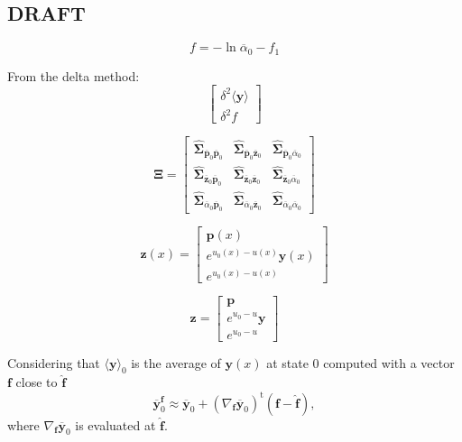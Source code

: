 \documentclass[aip,jcp,reprint,amsmath,amssymb]{revtex4-1}
\newcommand{\mt}[1]{\boldsymbol{\mathbf{#1}}}           %
\newcommand{\vt}[1]{\boldsymbol{\mathbf{#1}}}           %
\newcommand{\tr}[1]{#1^\text{t}}                        %
\begin{document}
\subsection{DRAFT}


\begin{equation*}
f = -\ln \overline{\alpha}_0 - f_1
\end{equation*}

From the delta method:
\begin{equation*}
\left[\begin{array}{c} \delta^2 \langle \vt y \rangle \\ \delta^2 f \end{array}\right]
\end{equation*}

\begin{equation*}
\mt \Xi = \left[\begin{array}{ccc} \hat{\mt \Sigma}_{\overline{\vt p}_0 \overline{\vt p}_0} & \hat{\mt \Sigma}_{\overline{\vt p}_0 \overline{\vt z}_0} & \hat{\mt \Sigma}_{\overline{\vt p}_0 \overline{\alpha}_0} \\ \hat{\mt \Sigma}_{\overline{\vt z}_0 \overline{\vt p}_0} & \hat{\mt \Sigma}_{\overline{\vt z}_0 \overline{\vt z}_0} & \hat{\mt \Sigma}_{\overline{\vt z}_0 \overline{\alpha}_0} \\ \hat{\mt \Sigma}_{\overline{\alpha}_0 \overline{\vt p}_0} & \hat{\mt \Sigma}_{\overline{\alpha}_0 \overline{\vt z}_0} & \hat{\mt \Sigma}_{\overline{\alpha}_0 \overline{\alpha}_0} \end{array}\right]
\end{equation*}

\begin{equation*}
\vt z(x) = \left[\begin{array}{c}
{\vt p}(x) \\
e^{u_0(x) - u(x)}{\vt y}(x) \\
e^{u_0(x) - u(x)}
\end{array}\right]
\end{equation*}

\begin{equation*}
\vt z = \left[\begin{array}{c}
{\vt p} \\
e^{u_0 - u}{\vt y} \\
e^{u_0 - u}
\end{array}\right]
\end{equation*}




Considering that $\langle{\vt y}\rangle_0$ is the average of $\vt y(x)$ at state $0$ computed with a vector $\vt f$ close to $\hat{\vt f}$
\begin{equation*}
\overline{\vt y}^{\vt f}_0 \approx \overline{\vt y}_0 + \tr{(\nabla_{\vt f}\overline{\vt y}_0)}({\vt f} - \hat{\vt f}),
\end{equation*}
where $\nabla_{\vt f}\overline{\vt y}_0$ is evaluated at $\hat{\vt f}$.
\end{document}
